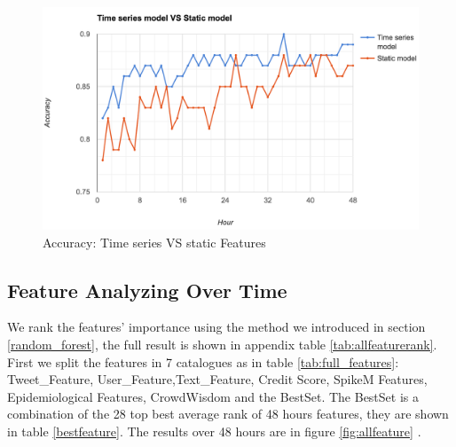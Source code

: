 \begin{figure}[!h]
\centering
\includegraphics[width=0.8\columnwidth]{images/Vsstatic.png}
\caption{Accuracy: Time series VS static Features}
\label{fig:TVSF}
\end{figure}

  \newpage
 \subsection{ Feature Analyzing Over Time} 
 \label{featureanalyzing}
 We rank the features' importance using the method we introduced in section \ref{random_forest}, the full result is shown in appendix table \ref{tab:allfeaturerank}.  First we split the features in 7 catalogues as in table \ref{tab:full_features}: Tweet\_Feature, User\_Feature,Text\_Feature,  Credit Score, SpikeM Features, Epidemiological Features, CrowdWisdom and the BestSet. The BestSet is a combination of the 28 top best average rank of 48 hours features, they are shown in table \ref{bestfeature}. The results over 48 hours are in figure \ref{fig:allfeature} .
 
